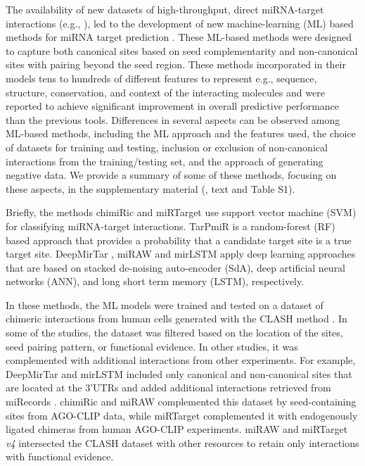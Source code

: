 \documentclass{bmcart}
\begin{document}
The availability of new datasets of high-throughput, direct miRNA-target interactions (e.g., \cite{scheel2017global, grosswendt2014unambiguous, darnell_moore2015mirna, helwak2013mapping}), led to the development of new machine-learning (ML) based methods for miRNA target prediction \cite{lu2016learning, ding2016tarpmir, pla2018miraw, wen2018deepmirtar, cheng2015mirtdl, menor2014mirmark}. These ML-based methods were designed to capture both canonical sites based on seed complementarity and non-canonical sites with pairing beyond the seed region. These methods incorporated in their models tens to hundreds of different features to represent e.g., sequence, structure, conservation, and context of the interacting molecules and were reported to achieve significant improvement in overall predictive performance than the previous tools. Differences in several aspects can be observed among ML-based methods, including the ML approach and the features used, the choice of datasets for training and testing, inclusion or exclusion of non-canonical interactions from the training/testing set, and the approach of generating negative data. We provide a summary of some of these methods, focusing on these aspects, in the supplementary material (, text and Table S1). 

Briefly, the methods chimiRic \cite{lu2016learning} and miRTarget \cite{wang2016improving,liu2019prediction} use support vector machine (SVM) for classifying miRNA-target interactions. TarPmiR \cite{ding2016tarpmir} is a random-forest (RF) based approach that provides a probability that a candidate target site is a true target site. DeepMirTar \cite{wen2018deepmirtar}, miRAW \cite{pla2018miraw}  and mirLSTM \cite{paker2019mirlstm} apply deep learning approaches that are based on stacked de-noising auto-encoder (SdA), deep artificial neural networks (ANN), and long short term memory (LSTM), respectively.  

In these methods, the ML models were trained and tested on a dataset of chimeric interactions from human cells generated with the CLASH method \cite{helwak2013mapping}. In some of the studies, the dataset was filtered based on the location of the sites, seed pairing pattern, or functional evidence. In other studies, it was complemented with additional interactions from other experiments. For example, DeepMirTar \cite{wen2018deepmirtar} and mirLSTM \cite{paker2019mirlstm} included only canonical and non-canonical sites that are located at the 3’UTRs and added additional interactions retrieved from miRecords \cite{xiao2009mirecords}. 
chimiRic \cite{lu2016learning} and miRAW \cite{pla2018miraw} complemented this dataset by seed-containing sites from AGO-CLIP data, while miRTarget \cite{wang2016improving} complemented it with endogenously ligated chimeras from human AGO-CLIP experiments. miRAW \cite{pla2018miraw} and miRTarget \textit{v4} \cite{liu2019prediction} intersected the CLASH dataset with other resources to retain only interactions with functional evidence.
\end{document}
